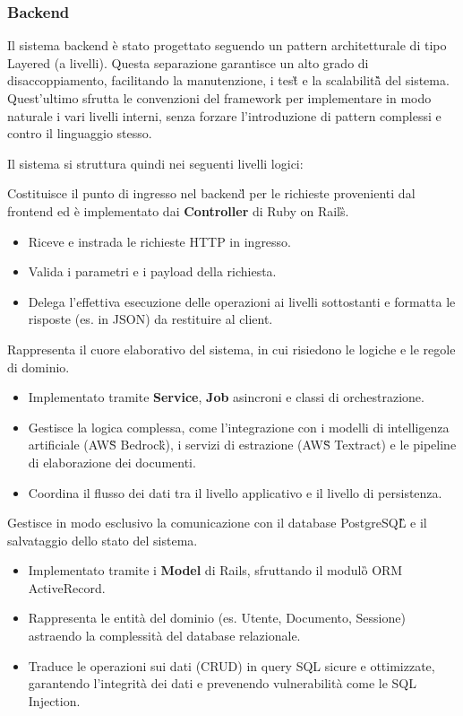 \documentclass[a4paper,11pt]{article}
\begin{document}
\subsubsection{Backend}
Il sistema backend è stato progettato seguendo un pattern architetturale di tipo Layered (a livelli). Questa separazione garantisce un alto grado di disaccoppiamento, 
facilitando la manutenzione, i test\G{} e la scalabilità\G{} del sistema.  
Quest'ultimo sfrutta le convenzioni del framework per implementare in modo naturale i vari livelli interni, senza forzare l'introduzione di pattern complessi e contro il linguaggio stesso. 

Il sistema si struttura quindi nei seguenti livelli logici:

Costituisce il punto di ingresso nel backend\G{} per le richieste provenienti dal frontend ed è implementato dai \textbf{Controller} di Ruby on Rails\G{}.
\begin{itemize}
  \item Riceve e instrada le richieste HTTP in ingresso.
  \item Valida i parametri e i payload della richiesta.
  \item Delega l'effettiva esecuzione delle operazioni ai livelli sottostanti e formatta le risposte (es. in JSON) da restituire al client.
\end{itemize}

Rappresenta il cuore elaborativo del sistema, in cui risiedono le logiche e le regole di dominio.
\begin{itemize}
  \item Implementato tramite \textbf{Service}, \textbf{Job} asincroni e classi di orchestrazione.
  \item Gestisce la logica complessa, come l'integrazione con i modelli di intelligenza artificiale (AWS\G{} Bedrock\G{}), i servizi di estrazione (AWS\G{} Textract) e le pipeline di elaborazione dei documenti.
  \item Coordina il flusso dei dati tra il livello applicativo e il livello di persistenza.
\end{itemize}

Gestisce in modo esclusivo la comunicazione con il database PostgreSQL\G{} e il salvataggio dello stato del sistema.
\begin{itemize}
  \item Implementato tramite i \textbf{Model} di Rails, sfruttando il modulo\G{} ORM ActiveRecord.
  \item Rappresenta le entità del dominio (es. Utente, Documento, Sessione) astraendo la complessità del database relazionale.
  \item Traduce le operazioni sui dati (CRUD) in query SQL sicure e ottimizzate, garantendo l'integrità dei dati e prevenendo vulnerabilità come le SQL Injection.
\end{itemize}
\end{document}
